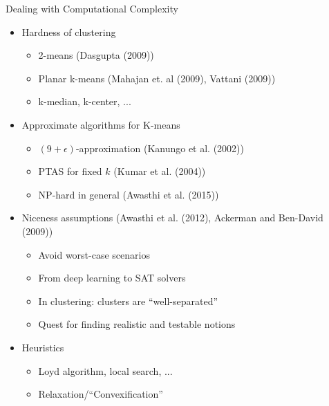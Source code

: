 \documentclass{beamer}
\begin{document}
\begin{frame}{Dealing with Computational Complexity}
  \begin{itemize}
  
    \item Hardness of clustering
    \begin{itemize}
        \item 2-means (Dasgupta (2009))
        \item Planar k-means (Mahajan et. al (2009), Vattani (2009))
        \item k-median, k-center, ...
    \end{itemize}
    \pause
    \item Approximate algorithms for K-means
    \begin{itemize}
        \item $(9+\epsilon)$-approximation (Kanungo et al. (2002))
        \item PTAS for fixed $k$ (Kumar et al. (2004))
        \item NP-hard in general (Awasthi et al. (2015))
    \end{itemize}
    
    \pause
    \item Niceness assumptions (Awasthi et al. (2012), Ackerman and Ben-David (2009))
    \begin{itemize}
        \item Avoid worst-case scenarios
        \item From deep learning to SAT solvers
        \item In clustering: clusters are ``well-separated''
        \item Quest for finding realistic and testable notions
    \end{itemize}
    
    \pause
    \item Heuristics
        \begin{itemize}
            \item Loyd algorithm, local search, ...
            \item Relaxation/``Convexification''
        \end{itemize}
        
        
  \end{itemize}
\end{frame}
\end{document}
